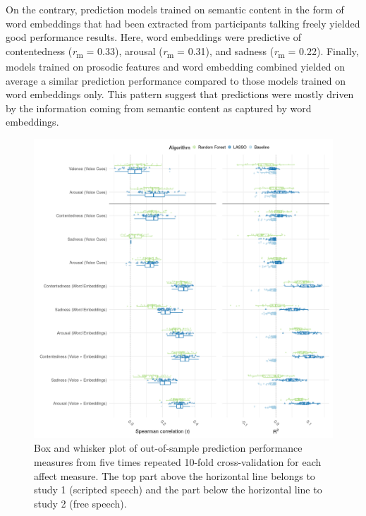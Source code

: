 \documentclass[
  english,
  man,floatsintext]{apa6}
\begin{document}
On the contrary, prediction models trained on semantic content in the form of word embeddings that had been extracted from participants talking freely yielded good performance results. Here, word embeddings were predictive of contentedness (\emph{r}\textsubscript{m} = 0.33), arousal (\emph{r}\textsubscript{m} = 0.31), and sadness (\emph{r}\textsubscript{m} = 0.22).
Finally, models trained on prosodic features and word embedding combined yielded on average a similar prediction performance compared to those models trained on word embeddings only. This pattern suggest that predictions were mostly driven by the information coming from semantic content as captured by word embeddings.
\newpage

\begin{figure}

{\centering \includegraphics[width=1\linewidth,height=1\textheight]{../figures/bmr_plot} 

}

\caption[Prediction performance]{Box and whisker plot of out-of-sample prediction performance measures from five times repeated 10-fold cross-validation for each affect measure. The top part above the horizontal line belongs to study 1 (scripted speech) and the part below the horizontal line to study 2 (free speech).}\label{fig:predictionoverview}
\end{figure}
\newpage
\end{document}
